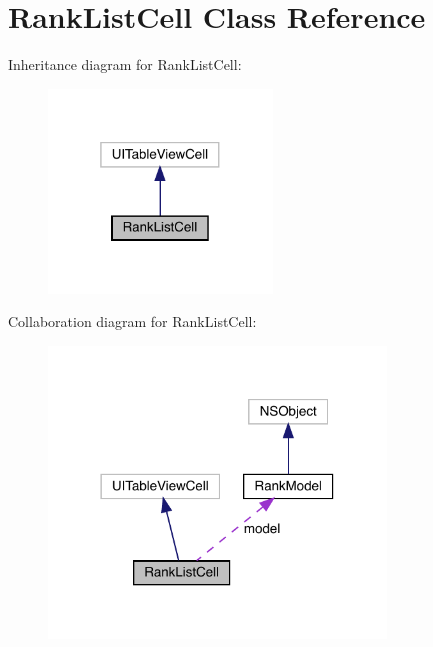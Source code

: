 \hypertarget{interface_rank_list_cell}{}\section{Rank\+List\+Cell Class Reference}
\label{interface_rank_list_cell}


Inheritance diagram for Rank\+List\+Cell\+:\nopagebreak
\begin{figure}[H]
\begin{center}
\leavevmode
\includegraphics[width=169pt]{interface_rank_list_cell__inherit__graph}
\end{center}
\end{figure}


Collaboration diagram for Rank\+List\+Cell\+:\nopagebreak
\begin{figure}[H]
\begin{center}
\leavevmode
\includegraphics[width=254pt]{interface_rank_list_cell__coll__graph}
\end{center}
\end{figure}
